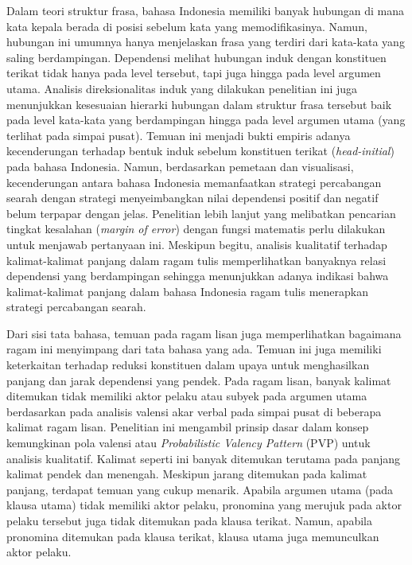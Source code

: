 Dalam teori struktur frasa, bahasa Indonesia memiliki banyak hubungan di mana kata kepala berada di posisi sebelum kata yang memodifikasinya. Namun, hubungan ini umumnya hanya menjelaskan frasa yang terdiri dari kata-kata yang saling berdampingan. Dependensi melihat hubungan induk dengan konstituen terikat tidak hanya pada level tersebut, tapi juga hingga pada level argumen utama. Analisis direksionalitas induk yang dilakukan penelitian ini juga menunjukkan kesesuaian hierarki hubungan dalam struktur frasa tersebut baik pada level kata-kata yang berdampingan hingga pada level argumen utama (yang terlihat pada simpai pusat). Temuan ini menjadi bukti empiris adanya kecenderungan terhadap bentuk induk sebelum konstituen terikat (\textit{head-initial}) pada bahasa Indonesia. Namun, berdasarkan pemetaan dan visualisasi, kecenderungan antara bahasa Indonesia memanfaatkan strategi percabangan searah dengan strategi menyeimbangkan nilai dependensi positif dan negatif belum terpapar dengan jelas. Penelitian lebih lanjut yang melibatkan pencarian tingkat kesalahan (\textit{margin of error}) dengan fungsi matematis perlu dilakukan untuk menjawab pertanyaan ini. Meskipun begitu, analisis kualitatif terhadap kalimat-kalimat panjang dalam ragam tulis memperlihatkan banyaknya relasi dependensi yang berdampingan sehingga menunjukkan adanya indikasi bahwa kalimat-kalimat panjang dalam bahasa Indonesia ragam tulis menerapkan strategi percabangan searah.

Dari sisi tata bahasa, temuan pada ragam lisan juga memperlihatkan bagaimana ragam ini menyimpang dari tata bahasa yang ada. Temuan ini juga memiliki keterkaitan terhadap reduksi konstituen dalam upaya untuk menghasilkan panjang dan jarak dependensi yang pendek. Pada ragam lisan, banyak kalimat ditemukan tidak memiliki aktor pelaku atau subyek pada argumen utama berdasarkan pada analisis valensi akar verbal pada simpai pusat di beberapa kalimat ragam lisan. Penelitian ini mengambil prinsip dasar dalam konsep kemungkinan pola valensi atau \textit{Probabilistic Valency Pattern} (PVP) \citep{liu2006syntactic} untuk analisis kualitatif. Kalimat seperti ini banyak ditemukan terutama pada panjang kalimat pendek dan menengah. Meskipun jarang ditemukan pada kalimat panjang, terdapat temuan yang cukup menarik. Apabila argumen utama (pada klausa utama) tidak memiliki aktor pelaku, pronomina yang merujuk pada aktor pelaku tersebut juga tidak ditemukan pada klausa terikat. Namun, apabila pronomina ditemukan pada klausa terikat, klausa utama juga memunculkan aktor pelaku. 

